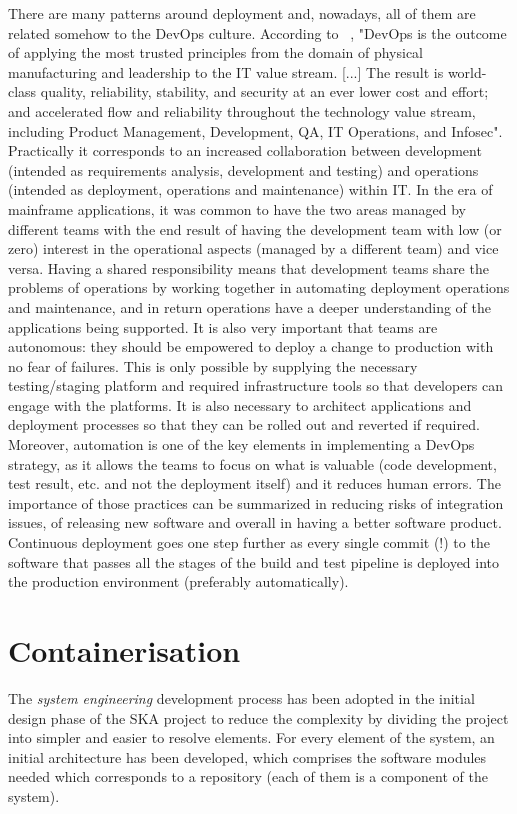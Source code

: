 \documentclass[a4paper]{spie}  %
\begin{document}
There are many patterns around deployment and, nowadays, all of them are related somehow to the DevOps culture. According to ~\cite{DevOps}, "DevOps is the outcome of applying the most trusted principles from the domain of physical manufacturing and leadership to the IT value stream. [...] The result is world-class quality, reliability, stability, and security at an ever lower cost and effort; and accelerated flow and reliability throughout the technology value stream, including Product Management, Development, QA, IT Operations, and Infosec". Practically it corresponds to an increased collaboration between development (intended as requirements analysis, development and testing) and operations (intended as deployment, operations and maintenance) within IT. In the era of mainframe applications, it was common to have the two areas managed by different teams with the end result of having the development team with low (or zero) interest in the operational aspects (managed by a different team) and vice versa. Having a shared responsibility means that development teams share the problems of operations by working together in automating deployment operations and maintenance, and in return operations have a deeper understanding of the applications being supported. It is also very important that teams are autonomous: they should be empowered to deploy a change to production with no fear of failures. This is only possible by supplying the necessary testing/staging platform and required infrastructure tools so that developers can engage with the platforms.  It is also necessary to architect applications and deployment processes so that they can be rolled out and reverted if required.
Moreover, automation is one of the key elements in implementing a DevOps strategy, as it allows the teams to focus on what is valuable (code development, test result, etc. and not the deployment itself) and it reduces human errors.
The importance of those practices can be summarized in reducing risks of integration issues, of releasing new software and overall in having a better software product.
Continuous deployment goes one step further as every single commit (!) to the software that passes all the stages of the build and test pipeline is deployed into the production environment (preferably automatically).

\section{Containerisation} \label{SKA-docker}
The \textit{system engineering} development process has been adopted in the initial design phase of the SKA project to reduce the complexity by dividing the project into simpler and easier to resolve elements. For every element of the system, an initial architecture has been developed, which comprises the software modules needed which corresponds to a repository (each of them is a component of the system).
\end{document}
